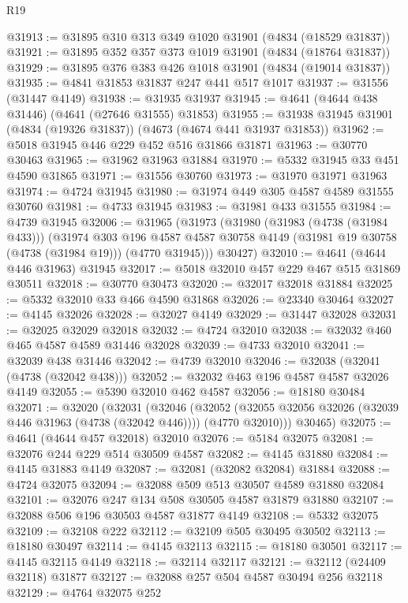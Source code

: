 \begin{lexlean}{R19}
\begin{coremodule}
@31913 := @31895 @310 @313 @349 @1020 @31901 (@4834 (@18529 @31837))
@31921 := @31895 @352 @357 @373 @1019 @31901 (@4834 (@18764 @31837))
@31929 := @31895 @376 @383 @426 @1018 @31901 (@4834 (@19014 @31837))
@31935 := @4841 @31853 @31837 @247 @441 @517 @1017
@31937 := @31556 (@31447 @4149)
@31938 := @31935 @31937
@31945 := @4641 (@4644 @438 @31446) (@4641 (@27646 @31555) @31853)
@31955 := @31938 @31945 @31901 (@4834 (@19326 @31837)) (@4673 (@4674 @441 @31937 @31853))
@31962 := @5018 @31945 @446 @229 @452 @516 @31866 @31871
@31963 := @30770 @30463
@31965 := @31962 @31963 @31884
@31970 := @5332 @31945 @33 @451 @4590 @31865
@31971 := @31556 @30760
@31973 := @31970 @31971 @31963
@31974 := @4724 @31945
@31980 := @31974 @449 @305 @4587 @4589 @31555 @30760
@31981 := @4733 @31945
@31983 := @31981 @433 @31555
@31984 := @4739 @31945
@32006 := @31965
    (@31973
      (@31980
        (@31983 (@4738 (@31984 @433)))
        (@31974
          @303
          @196
          @4587
          @4587
          @30758
          @4149
          (@31981 @19 @30758 (@4738 (@31984 @19)))
          (@4770 @31945)))
      @30427)
@32010 := @4641 (@4644 @446 @31963) @31945
@32017 := @5018 @32010 @457 @229 @467 @515 @31869 @30511
@32018 := @30770 @30473
@32020 := @32017 @32018 @31884
@32025 := @5332 @32010 @33 @466 @4590 @31868
@32026 := @23340 @30464
@32027 := @4145 @32026
@32028 := @32027 @4149
@32029 := @31447 @32028
@32031 := @32025 @32029 @32018
@32032 := @4724 @32010
@32038 := @32032 @460 @465 @4587 @4589 @31446 @32028
@32039 := @4733 @32010
@32041 := @32039 @438 @31446
@32042 := @4739 @32010
@32046 := @32038 (@32041 (@4738 (@32042 @438)))
@32052 := @32032 @463 @196 @4587 @4587 @32026 @4149
@32055 := @5390 @32010 @462 @4587
@32056 := @18180 @30484
@32071 := @32020
    (@32031
      (@32046
        (@32052 (@32055 @32056 @32026 (@32039 @446 @31963 (@4738 (@32042 @446)))) (@4770 @32010)))
      @30465)
@32075 := @4641 (@4644 @457 @32018) @32010
@32076 := @5184 @32075
@32081 := @32076 @244 @229 @514 @30509 @4587
@32082 := @4145 @31880
@32084 := @4145 @31883 @4149
@32087 := @32081 (@32082 @32084) @31884
@32088 := @4724 @32075
@32094 := @32088 @509 @513 @30507 @4589 @31880 @32084
@32101 := @32076 @247 @134 @508 @30505 @4587 @31879 @31880
@32107 := @32088 @506 @196 @30503 @4587 @31877 @4149
@32108 := @5332 @32075
@32109 := @32108 @222
@32112 := @32109 @505 @30495 @30502
@32113 := @18180 @30497
@32114 := @4145 @32113
@32115 := @18180 @30501
@32117 := @4145 @32115 @4149
@32118 := @32114 @32117
@32121 := @32112 (@24409 @32118) @31877
@32127 := @32088 @257 @504 @4587 @30494 @256 @32118
@32129 := @4764 @32075 @252

\end{coremodule}
\end{lexlean}
